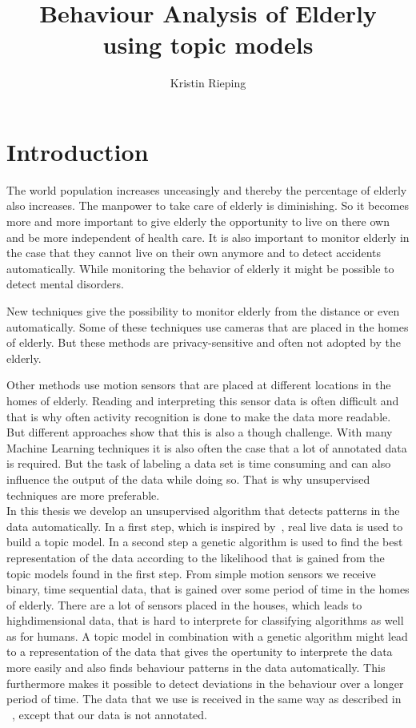 \documentclass[11pt,a4paper]{article}
\title{Behaviour Analysis of Elderly using topic models}
\author{Kristin Rieping}
\begin{document}
\maketitle
\pagebreak
\tableofcontents
\pagebreak
\section{Introduction}
The world population increases unceasingly and thereby the percentage of elderly also increases. The manpower to take care of elderly is diminishing. So it becomes more and more important to give elderly the opportunity to live on there own and be more independent of health care. It is also important to monitor elderly in the case that they cannot live on their own anymore and to detect accidents automatically. While monitoring the behavior of elderly it might be possible to detect mental disorders.

New techniques give the possibility to monitor elderly from the distance or even automatically. Some of these techniques use cameras that are placed in the homes of elderly. But these methods are privacy-sensitive and often not adopted by the elderly.

Other methods use motion sensors that are placed at different locations in the homes of elderly. %
Reading and interpreting this sensor data is often difficult and that is why often activity recognition is done to make the data more readable. But different approaches show that this is also a though challenge.
With many Machine Learning techniques it is also often the case that a lot of annotated data is required.  But the task of labeling a data set is time consuming and can also influence the output of the data while doing so. That is why unsupervised techniques are more preferable.\\



In this thesis we develop an unsupervised algorithm that detects patterns in the data automatically.
In a first step, which is inspired by~\cite{farrahi2008daily}, real live data is used to build a topic model. In a second step a genetic algorithm is used to find the best representation of the data according to the likelihood that is gained from the topic models found in the first step. 
From simple motion sensors we receive binary, time sequential data, that is gained over some period of time in the homes of elderly. There are a lot of sensors placed in the houses, which leads to highdimensional data, that is hard to interprete for classifying algorithms as well as for humans. A topic model in combination with a genetic algorithm might lead to a representation of the data that gives the opertunity to interprete the data more easily and also finds behaviour patterns in the data automatically. This furthermore makes it possible to detect deviations in the behaviour over a longer period of time. The data that we use is received in the same way as described in ~\cite{van2010activity}, except that our data is not annotated.\\
\end{document}
